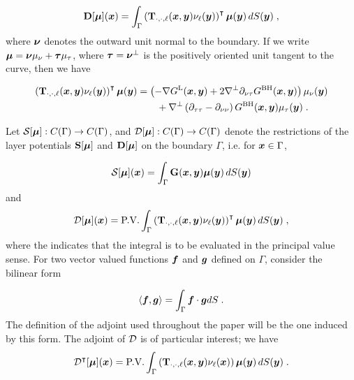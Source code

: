 \begin{equation} \label{eq:doublelayer}
  {\bf D} [{\boldsymbol \mu}] ({\boldsymbol x}) = \int_\Gamma \left ( {\bf T}_{\cdot,\cdot,\ell}({\boldsymbol x},{\boldsymbol y})
  \nu_\ell({\boldsymbol y})\right )^\intercal {\boldsymbol \mu}({\boldsymbol y}) \, dS({\boldsymbol y}) \; ,
\end{equation}
where ${\boldsymbol \nu}$ denotes the outward unit normal to the boundary.
If we write ${\boldsymbol \mu} = {\boldsymbol \nu} \mu_\nu + {\boldsymbol \tau} \mu_\tau$,
where ${\boldsymbol \tau} = {\boldsymbol \nu}^\bot$ is the positively oriented unit
tangent to the curve, then we have

\begin{align} \label{eq:stokesdlkernel}
  \left ( {\bf T}_{\cdot,\cdot,\ell}({\boldsymbol x},{\boldsymbol y})\nu_\ell({\boldsymbol y}) \right )^\intercal
  {\boldsymbol \mu}({\boldsymbol y}) &= \left ( - \nabla G^{\textrm{L}}({\boldsymbol x},{\boldsymbol y}) + 2 \nabla^\bot
  \partial_{\nu\tau} G^{\textrm{BH}}({\boldsymbol x},{\boldsymbol y}) \right ) \mu_\nu({\boldsymbol y}) \nonumber \\
  & \qquad+
  \nabla^\bot \left (\partial_{\tau\tau}-\partial_{\nu\nu} \right )
  G^{\textrm{BH}}({\boldsymbol x},{\boldsymbol y}) \mu_\tau({\boldsymbol y}) \; .
\end{align}

Let ${\mathcal S}[{\boldsymbol \mu}]: C(\Gamma) \to C(\Gamma)$, and
${\mathcal D}[{\boldsymbol \mu}]: C(\Gamma) \to C(\Gamma)$ 
denote the restrictions of the layer potentials 
${\bf S}[{\boldsymbol \mu}]$ and ${\bf D}[{\boldsymbol \mu}]$ on the boundary $\Gamma$, i.e.
for ${\boldsymbol x} \in \Gamma$, 

\begin{equation}
  {\mathcal S} [{\boldsymbol \mu}] ({\boldsymbol x}) = \int_\Gamma {\bf G} ({\boldsymbol x},{\boldsymbol y}) {\boldsymbol \mu}({\boldsymbol y})
  \, dS({\boldsymbol y})
\end{equation}
and
\begin{equation}
\label{eq:dlformula}
  {\mathcal D} [{\boldsymbol \mu}] ({\boldsymbol x}) = \textrm{P.V.} \int_\Gamma \left ( {\bf T}_{\cdot,\cdot,\ell}({\boldsymbol x},{\boldsymbol y})
  \nu_\ell({\boldsymbol y})
  \right )^\intercal {\boldsymbol \mu}({\boldsymbol y}) \, dS({\boldsymbol y}) \; ,
\end{equation}
where the \pv indicates that the integral is to be
evaluated in the principal value sense. 
For two vector valued
functions ${\boldsymbol f}$ and ${\boldsymbol g}$ defined on $\Gamma$, consider the bilinear
form

\begin{equation} \label{eq:bi_form}
  \langle {\boldsymbol f} , {\boldsymbol g} \rangle = \int_\Gamma {\boldsymbol f} \cdot {\boldsymbol g} dS \; .
\end{equation}
The definition of the adjoint used throughout the paper will be
the one induced by this form.
The adjoint of ${\mathcal D}$ is of particular interest; we have
\begin{equation}
  {\mathcal D}^{\intercal} [{\boldsymbol \mu}]({\boldsymbol x}) = 
  \textrm{P.V.} \int_\Gamma \left ( {\bf T}_{\cdot,\cdot,\ell}({\boldsymbol x},{\boldsymbol y})\nu_\ell({\boldsymbol x})
  \right ) {\boldsymbol \mu}({\boldsymbol y}) \, dS({\boldsymbol y}) \; .
\end{equation}


